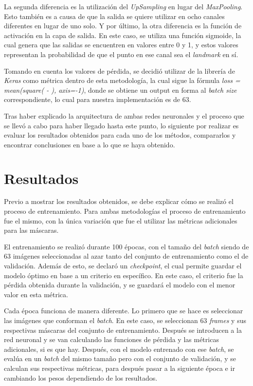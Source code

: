 \documentclass[runningheads]{llncs}
\begin{document}
La segunda diferencia es la utilización del \textit{UpSampling} en lugar del \textit{MaxPooling}. Esto también es a causa de que la salida se quiere utilizar en ocho canales diferentes en lugar de uno solo. Y por último, la otra diferencia es la función de activación en la capa de salida. En este caso, se utiliza una función sigmoide, la cual genera que las salidas se encuentren en valores entre 0 y 1, y estos valores representan la probabilidad de que el punto en ese canal sea el \textit{landmark} en sí.

Tomando en cuenta los valores de pérdida, se decidió utilizar  de la librería de \textit{Keras} como métrica dentro de esta metodología, la cual sigue la fórmula {\textit{loss = mean(square( - ), axis=-1)}}, donde se obtiene un output en forma al \textit{batch size} correspondiente, lo cual para nuestra implementación es de 63.

Tras haber explicado la arquitectura de ambas redes neuronales y el proceso que se llevó a cabo para haber llegado hasta este punto, lo siguiente por realizar es evaluar los resultados obtenidos para cada uno de los métodos, compararlos y encontrar conclusiones en base a lo que se haya obtenido. 

\section{Resultados}
Previo a mostrar los resultados obtenidos, se debe explicar cómo se realizó el proceso de entrenamiento. Para ambas metodologías el proceso de entrenamiento fue el mismo, con la única variación que fue el utilizar las métricas adicionales para las máscaras. 

El entrenamiento se realizó durante 100 épocas, con el tamaño del \textit{batch} siendo de 63 imágenes seleccionadas al azar tanto del conjunto de entrenamiento como el de validación. Además de esto, se declaró un \textit{checkpoint}, el cual permite guardar el modelo óptimo en base a un criterio en específico. En este caso, el criterio fue la pérdida obtenida durante la validación, y se guardará el modelo con el menor valor en esta métrica.

Cada época funciona de manera diferente. Lo primero que se hace es seleccionar las imágenes que conforman el \textit{batch}. En este caso, se seleccionan 63 \textit{frames} y sus respectivas máscaras del conjunto de entrenamiento. Después se introducen a la red neuronal y se van calculando las funciones de pérdida y las métricas adicionales, si es que hay. Después, con el modelo entrenado con ese \textit{batch}, se evalúa en un \textit{batch} del mismo tamaño pero con el conjunto de validación, y se calculan sus respectivas métricas, para después pasar a la siguiente época e ir cambiando los pesos dependiendo de los resultados. 
\end{document}

